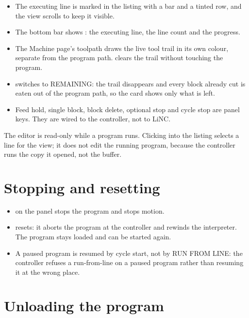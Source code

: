 \begin{itemize}
  \item The executing line is marked in the listing with a bar and a tinted row, and the view
        scrolls to keep it visible.
  \item The bottom bar shows : the executing line, the line count and
        the progress.
  \item The Machine page's toolpath draws the live tool trail in its own colour, separate
        from the program path.  clears the trail without touching
        the program.
  \item {} switches to REMAINING: the trail disappears and every block
        already cut is eaten out of the program path, so the card shows only what is left.
  \item Feed hold, single block, block delete, optional stop and cycle stop are panel keys.
        They are wired to the controller, not to LiNC.
\end{itemize}

\begin{notebox}
  The editor is read-only while a program runs. Clicking into the listing selects a line for
  the view; it does not edit the running program, because the controller runs the copy it
  opened, not the buffer.
\end{notebox}

\section{Stopping and resetting}

\begin{itemize}
  \item {} on the panel stops the program and stops motion.
  \item {} resets: it aborts the program at the controller and rewinds the
        interpreter. The program stays loaded and can be started again.
  \item A paused program is resumed by cycle start, not by RUN FROM LINE: the controller
        refuses a run-from-line on a paused program rather than resuming it at the wrong
        place.
\end{itemize}

\section{Unloading the program}
\label{sec:unload}

